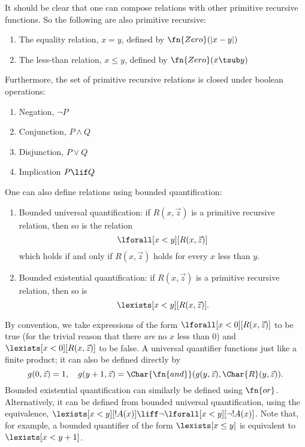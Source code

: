 \documentclass[../../include/open-logic-section]{subfiles}
\begin{document}
It should be clear that one can compose relations with other primitive
recursive functions. So the following are also primitive recursive:
\begin{enumerate}
\item The equality relation, $x = y$, defined by $\fn{Zero}(|x - y|)$
\item The less-than relation, $x \leq y$, defined by $\fn{Zero}(x
  \tsub y)$
\end{enumerate}
Furthermore, the set of primitive recursive relations is closed under
boolean operations:
\begin{enumerate}
\item Negation, $\lnot P$
\item Conjunction, $P \land Q$
\item Disjunction, $P \lor Q$
\item Implication $P \lif Q$
\end{enumerate}
One can also define relations using bounded quantification:
\begin{enumerate}
\item Bounded universal quantification: if $R(x, \vec z)$ is a
primitive recursive relation, then so is the relation 
\[
\lforall[x < y][R(x, \vec z)]
\]
which holds if and only if $R(x,\vec z)$ holds for every $x$ less than
$y$.
\item Bounded existential quantification: if $R(x, \vec z)$ is a
primitive recursive relation, then so is 
\[
\lexists[x < y][R(x, \vec z)].
\]
\end{enumerate}
By convention, we take expressions of the form $\lforall[x < 0][R(x,\vec
z)]$ to be true (for the trivial reason that there \emph{are} no $x$
less than $0$) and $\lexists[x < 0][R(x,\vec z)]$ to be false. A universal
quantifier functions just like a finite product; it can also be
defined directly by
\[
g(0,\vec z) = 1, \quad g(y+1,\vec z) = \Char{\fn{and}}(g(y,\vec
z),\Char{R}(y,\vec z)).
\]
Bounded existential quantification can similarly be defined using
$\fn{or}$. Alternatively, it can be defined from bounded universal
quantification, using the equivalence, $\lexists[x < y][!A(x)] \liff \lnot
\lforall[x < y][\lnot !A(x)]$. Note that, for example, a bounded quantifier
of the form $\lexists[x \leq y]$ is equivalent to $\lexists[x < y+1]$.
\end{document}
